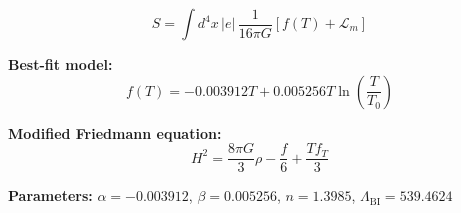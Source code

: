 
\begin{equation}
  S = \int d^4x \, |e| \, \frac{1}{16\pi G} \left[ f(T) + \mathcal{L}_m \right]
\end{equation}

\textbf{Best-fit model:}
\begin{equation}
  f(T) = -0.003912 T + 0.005256 T \ln\!\left(\frac{T}{T_0}\right)
\end{equation}

\textbf{Modified Friedmann equation:}
\begin{equation}
  H^2 = \frac{8\pi G}{3} \rho - \frac{f}{6} + \frac{T f_T}{3}
\end{equation}

\textbf{Parameters:}
$\alpha = -0.003912$, \quad
$\beta = 0.005256$, \quad
$n = 1.3985$, \quad
$\Lambda_{\text{BI}} = 539.4624$